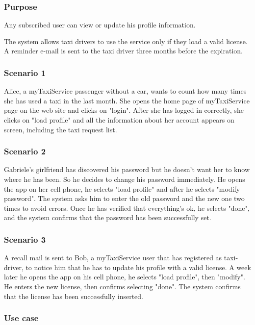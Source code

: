 \label{user-profile}
\subsubsection{Purpose}
Any subscribed user can view or update his profile information. 

The system allows taxi drivers to use the service only if they load a valid license. A reminder e-mail is sent to the taxi driver three months before the expiration. 


\subsubsection{Scenario 1}
Alice, a myTaxiService passenger without a car, wants to count how many times she has used a taxi in the last month.
She opens the home page of myTaxiService page on the web site and clicks on "login". 
After she has logged in correctly, she clicks on "load profile" and all the information about her account appears on screen, including the taxi request list. 

\subsubsection{Scenario 2}
Gabriele's girlfriend has discovered his password but he doesn't want her to know where he has been. So he decides to change his password immediately. He opens the app on her cell phone, he selects "load profile" and after he selects "modify password". The system asks him to enter the old password and the new one two times to avoid errors. Once he has verified that everything's ok, he selects "done", and the system confirms that the password has been successfully set.

\subsubsection{Scenario 3}
A recall mail is sent to Bob, a myTaxiService user that has registered as taxi-driver, to notice him that he has to update his profile with a valid license. A week later he opens the app on his cell phone, he selects "load profile", then "modify". He enters the new license, then confirms selecting "done". The system confirms that the license has been successfully inserted.



\subsubsection{Use case}

